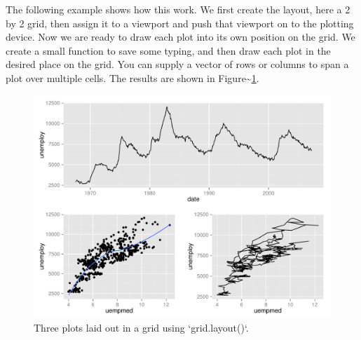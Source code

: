 The following example shows how this work. We first create the layout,
here a 2 by 2 grid, then assign it to a viewport and push that viewport
on to the plotting device. Now we are ready to draw each plot into its
own position on the grid. We create a small function to save some
typing, and then draw each plot in the desired place on the grid. You
can supply a vector of rows or columns to span a plot over multiple
cells. The results are shown in
Figure\textasciitilde{}\ref{fig:layout-2}.

\begin{Shaded}
\begin{Highlighting}[]
\NormalTok{(}\NormalTok{, } \NormalTok{, } \NormalTok{)}
\NormalTok{()}
\NormalTok{(}\NormalTok{(} \NormalTok{(}\NormalTok{, }\NormalTok{)))}

\StringTok{ }
  \NormalTok{(}  
 \NormalTok{(}\NormalTok{, }\NormalTok{:}\NormalTok{))}
 \NormalTok{(}\NormalTok{, }\NormalTok{))}
 \NormalTok{(}\NormalTok{, }\NormalTok{))}
\NormalTok{()}
\end{Highlighting}
\end{Shaded}

\begin{figure}[htbp]
  \centering
    \includegraphics[width=\linewidth]{diagrams/polishing-layout}
  \caption{Three plots laid out in a grid using `grid.layout()`.}
  \label{fig:layout-2}
\end{figure}

